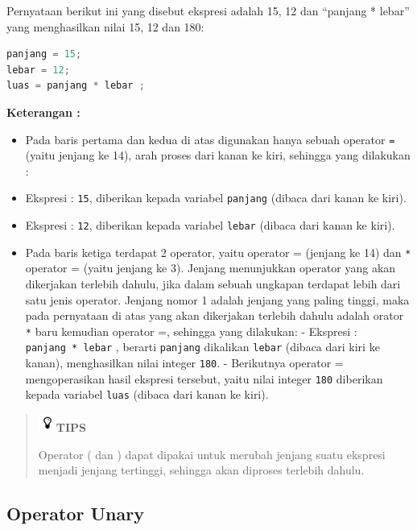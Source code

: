 Pernyataan berikut ini yang disebut ekspresi adalah 15, 12 dan ``panjang
* lebar'' yang menghasilkan nilai 15, 12 dan 180:

\begin{lstlisting}[language=c++, numbers=none]
panjang = 15;
lebar = 12;
luas = panjang * lebar ;
\end{lstlisting}

\textbf{Keterangan :}

\begin{itemize}

\item
  Pada baris pertama dan kedua di atas digunakan hanya sebuah operator
  \texttt{=} (yaitu jenjang ke 14), arah proses dari kanan ke kiri,
  sehingga yang dilakukan :
\item
  Ekspresi : \texttt{15}, diberikan kepada variabel \texttt{panjang}
  (dibaca dari kanan ke kiri).
\item
  Ekspresi : \texttt{12}, diberikan kepada variabel \texttt{lebar}
  (dibaca dari kanan ke kiri).
\item
  Pada baris ketiga terdapat 2 operator, yaitu operator =  (jenjang
  ke 14) dan \texttt{*} operator = (yaitu jenjang ke 3).
  Jenjang menunjukkan operator yang akan dikerjakan terlebih dahulu,
  jika dalam sebuah ungkapan terdapat lebih dari satu jenis operator.
  Jenjang nomor 1 adalah jenjang yang paling tinggi, maka pada
  pernyataan di atas yang akan dikerjakan terlebih dahulu adalah orator
  \texttt{*} baru kemudian operator =, sehingga yang dilakukan:
  - Ekspresi : \texttt{panjang\ *\ lebar} , berarti \texttt{panjang}
  dikalikan \texttt{lebar} (dibaca dari kiri ke kanan), menghasilkan
  nilai integer \texttt{180}. - Berikutnya operator = mengoperasikan
  hasil ekspresi tersebut, yaitu nilai integer \texttt{180} diberikan
  kepada variabel \texttt{luas} (dibaca dari kanan ke kiri).
\end{itemize}

\begin{quotation}
\includegraphics{../manuscript/images/tips.png}\textbf{TIPS}

Operator
( dan ) dapat dipakai untuk merubah jenjang suatu ekspresi
menjadi jenjang tertinggi, sehingga akan diproses terlebih dahulu.
\end{quotation}


\subsection{ Operator Unary}\label{a-operator-unary}

